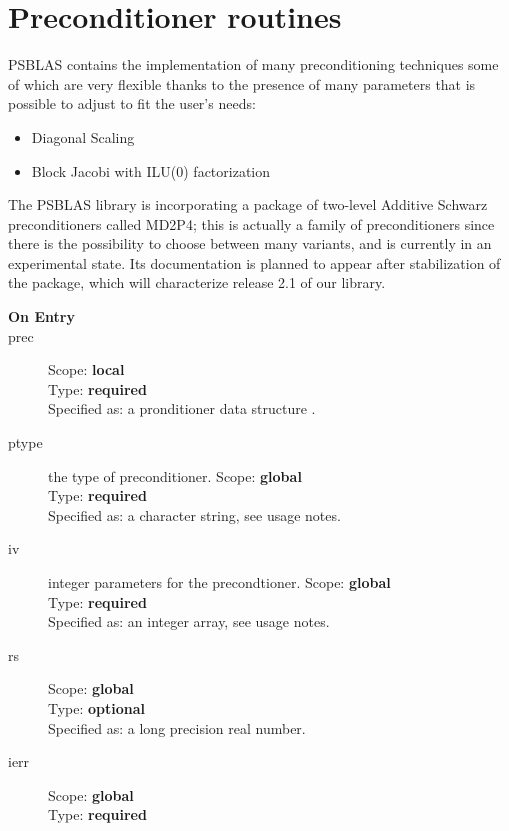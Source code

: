 \section{Preconditioner routines}
\label{sec:precs}

\label{sec:psprecs}
PSBLAS contains the implementation of many preconditioning
techniques some of which are very flexible thanks to the presence of
many parameters that is possible to adjust to fit the user's needs:
\begin{itemize}
\item Diagonal Scaling
\item Block Jacobi with ILU(0) factorization
\end{itemize}
The PSBLAS library is incorporating a package of two-level Additive
  Schwarz preconditioners called MD2P4; this is actually a family of 
  preconditioners since there is the possibility to choose between
  many variants, and is currently in an experimental state. Its
  documentation is planned to appear after stabilization of the
  package, which will characterize release  2.1 of our library.






\begin{description}
\item[\bf On Entry]
\item[prec] 
Scope: {\bf local} \\
Type: {\bf required}\\
Specified as: a pronditioner data structure \precdata.
\item[ptype] the type of preconditioner. 
Scope: {\bf global} \\
Type: {\bf required}\\
Specified as: a character string, see usage notes.
\item[iv] integer parameters for the precondtioner. 
Scope: {\bf global} \\
Type: {\bf required}\\
Specified as: an integer array, see usage notes. 
\item[rs] 
Scope: {\bf global} \\
Type: {\bf optional}\\
Specified as: a long precision real number.

\item[ierr] 
Scope: {\bf global} \\
Type: {\bf required}\\
\end{description}
